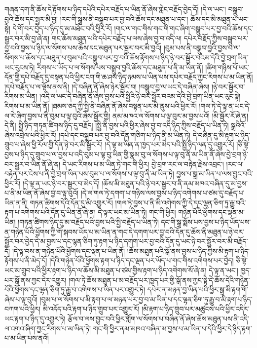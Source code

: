 གཞན་དག་ནི་ཆོས་དེ་རྟོགས་པ་ཉིད་དཔེའི་དཔེར་བརྗོད་པ་ཡིན་ནོ་ཞེས་གླེང་བརྗོད་བྱེད་དོ། །དེ་ལ་ཡང་། བསྒྲུབ་བྱའི་ཆོས་དང་སྦྱར་མི་བྱ། །རང་གི་སྒྲས་ནི་བསྒྲུབ་པར་བྱ་བའི་ཆོས་དང་མཐུན་པ་དང་། ཆོས་དང་མི་མཐུན་པ་ཡང་སྟེ། དེ་གོ་བར་བྱེད་པ་ཉིད་དུ་མ་མཐོང་བའི་ཕྱིར་རོ། །གང་ལ་གང་གིས་གང་གི་གང་ཞིག་བསྒྲུབ་པར་བྱ་བའི་ཆོས་དང་སྦྱར་བར་མི་བྱ་ཞེ་ན། གང་ཆོས་མཐུན་པའི་དཔེར་བརྗོད་པ་ལས་ཞེས་བྱ་བ་འདི་ལ། དཔེར་བརྗོད་ཀྱིས་བསྒྲུབ་པར་བྱ་བའི་བྱས་པ་ཉིད་ལ་སོགས་པས་ཆོས་དང་མཐུན་པར་སྦྱར་བར་མི་བྱའོ། །བུམ་པས་ནི་བསྒྲུབ་བྱའི་བྱས་པ་ལ་སོགས་པ་ཆོས་དང་མཐུན་པ་བུམ་པའི་བསྒྲུབ་པར་བྱ་བའི་ཆོས་རྟོགས་པ་ཉིད་ཉེ་བར་སྦྱོར་བའམ་དེའི་བྱེ་བྲག་ཡིན་ཡང་རུངས་ཏེ། རིགས་པ་ཡོད་པ་ལ་སོགས་པས་བསྒྲུབ་བྱའི་ཆོས་དང་མཐུན་པ་ནི་མ་ཡིན་ནོ། །ཚིག་གཉིས་པོ་ཡང་དོན་གྱི་དཔེ་བརྗོད་དུ་བསྟན་པའི་ཕྱིར་ངག་གི་ཆ་ཤས་ཉིད་ཉམས་པ་ཡིན་པས་དཔེར་བརྗོད་ཀྱང་རིགས་པ་མ་ཡིན་ནོ། །དཔེ་བརྗོད་པ་ལ་ལྟོས་ནས་ནི། །དེ་བཞིན་ནོ་ཞེས་ཉེར་སྦྱོར་བ། །བསྒྲུབ་བྱ་ལ་ཡང་དེ་བཞིན་ཞེས། །ཉེ་བར་སྦྱོར་བ་རིགས་མ་ཡིན། །འདི་ལ་ཡང་དེ་བཞིན་ནོ་ཞེས་བྱས་པའི་སྤྱིའི་ཉེ་བར་སྦྱོར་བའམ་དེའི་བྱེ་བྲག་ཡིན་ཡང་རུང་སྟེ། རིགས་པ་མ་ཡིན་ནོ། །ཐམས་ཅད་ཀྱི་སྤྱི་ནི་བཞིན་ནོ་ཞེས་བསྟན་པར་མི་ནུས་པའི་ཕྱིར་རོ། །གལ་ཏེ་དེ་ལྟ་ན་ཡང་དེ་ལ་རེ་ཞིག་བྱས་པ་ནི་བུམ་པ་ལྟ་བུའི་ཞེས་སྦྱོར་གྱི། ནམ་མཁའ་ལ་སོགས་པ་ལྟ་བུར་མ་བྱས་པའོ། །མི་སྦྱོར་རོ་ཞེ་ན། དེ་ནི། སྤྱི་ཉིད་གཏན་ཚིགས་ཉིད་དུ་བརྗོད། །སྤྱི་ནི་བྱས་པའི་ཕྱིར་ཞེས་བྱ་བ་འདི་ཉིད་ཀྱིས་བརྗོད་པ་ཡིན་ཏེ། སྒྲའིའོ་ཞེས་འབྲེལ་པའི་ཕྱིར་རོ། །དཔེ་དང་བསྒྲུབ་པར་བྱ་བའི་དོན་གཅིག་པ་ཉིད་ནི་མ་ཡིན་ཏེ། དེ་བཞིན་དུ་མི་རྟག་པ་ཉིད་གྲུབ་པ་ཞེས་ཕྱི་རོལ་གྱི་དོན་ཉེ་བར་མི་སྦྱོར་རོ། །དེ་ལྟ་མ་ཡིན་ན་ཁྱད་པར་མེད་པའི་སྤྱི་ཉིད་ལན་དུ་འགྱུར་རོ། །ཅི་སྟེ་བྱས་པ་ཉིད་དུ་གྲུབ་པ་ལ་བྱས་པ་འདི་བུམ་པ་ལྟ་བུ་ཡིན་གྱི་སྣམ་བུ་ལ་སོགས་པ་ལྟ་བུ་ནི་མ་ཡིན་ནོ་ཞེས་བྱེ་བྲག་ཉེ་བར་སྦྱར་བ་ཡིན་ནོ་ཞེ་ན། དེ་ཡང་རིགས་པ་མ་ཡིན་ཏེ་གང་གི་ཕྱིར། བྱེ་བྲག་རང་ལ་བརྟེན་རྗེས་འབྲང་། །རང་ལ་བརྟེན་པར་ངེས་པ་ནི་བྱེ་བྲག་ཡིན་པས་བུམ་པ་ལ་སོགས་པ་ལྟ་བུ་ནི་མ་ཡིན་ཏེ། བྱས་པ་སྒྲ་མ་ཡིན་པ་ལས་བྱུང་བའི་ཕྱིར་རོ། །དེ་ལྟ་ན་ཡང་ཉེ་བར་སྦྱར་བ་མེད་དོ། །ཆོས་མི་མཐུན་པའི་ཉེ་བར་སྦྱར་བ་ནི་ནམ་མཁའ་བཞིན་དུ་མ་བྱས་པ་ནི་མ་ཡིན་ནོ་ཞེས་བྱ་བ་ལྟ་བུའོ། །དེ་ལ་གལ་ཏེ་དགག་པ་གཉིས་ལས་བྱས་པ་ཉིད་འགེགས་པ་ཙམ་དུ་བརྗོད་པ་ཡིན་ན་ནི། གཏན་ཚིགས་དེའི་དོན་དུ་མི་འགྱུར་རོ། །གལ་ཏེ་བྱས་པ་ནི་མི་འགེགས་ཀྱི་དེ་དང་ལྷན་ཅིག་ཏུ་རྒྱུ་བའི་རྟག་པ་འགེགས་པའི་དོན་དུ་ཡིན་ནོ་ཞེ་ན། དེ་ལྟར་ཡང་མ་ཡིན་ཏེ། གང་གི་ཕྱིར། གཉེན་པོའི་ཕྱོགས་དང་ལྡན་མ་ཡིན། །གཏན་ཚིགས་ཉིད་དུ་མ་བརྗོད་པའི་བྱས་པའི་སྤྱི་བརྗོད་པ་ཡིན་ཏེ། དང་གི་སྒྲ་སྨོས་པས་བྱས་པ་ཉིད་ཡོད་པས་ན་གཉེན་པོའི་ཕྱོགས་ཀྱི་གོ་སྐབས་ཡོད་པ་མ་ཡིན་ན་གང་དེ་དགག་པར་བྱ་བའི་དོན་དུ་ཆོས་ནི་མཐུན་པ་ཉེ་བར་སྦྱོར་བར་བྱེད་དེ་མ་བྱས་པ་དང་ལྷན་ཅིག་ཏུ་རྟག་པ་ཉིད་དགག་པར་བྱ་བའི་དོན་དུ་ཡང་ཉེ་བར་སྦྱོར་བར་མི་བརྗོད་དོ། །དེ་ལྟ་བས་ན་གཉེན་པོའི་ཕྱོགས་དང་ལྡན་པ་ཡིན་ནོ། །ཆོས་མཐུན་པའི་སྒོ་ནས་བྱས་པ་ཉིད་ཀྱིས་མི་རྟག་པ་ཉིད་རྟོགས་པ་ནི་མེད་དོ། །དེའི་གཉེན་པོའི་ཕྱོགས་རྟག་པ་ཉིད་དང་ལྡན་པར་ཡོད་པ་གང་གིས་འགེགས་པར་བྱེད། ཅི་སྟེ་ཡང་མ་གྲུབ་པའི་ཕྱིར་རྟག་པ་ཉིད་ལ་ཆོས་མི་མཐུན་པ་ཙམ་གྱིས་རྟག་པ་ཉིད་འགེགས་སོ་ཞེ་ན། དེ་ལྟ་ན་ཡང་། ཁྱད་པར་སྒོ་ནས་ཀྱང་དེར་འགྱུར། །གལ་ཏེ་ཆོས་མཐུན་པ་མ་བརྗོད་པར་ཁྱད་པར་གྱི་སྒོ་ནས་ཀྱང་སྟེ་དེ་ཆོས་དེའི་གཉེན་པོའི་ཕྱོགས་དང་ལྷན་ཅིག་ཏུ་རྒྱུ་བ་འགེགས་པ་ཡིན་པར་འགྱུར་ཏེ། དཔེར་ན་མཉན་བྱ་ཡིན་པའི་ཕྱིར་སྒྲ་མི་རྟག་གོ་ཞེས་པ་ལྟ་བུའོ། །བུམ་པ་ལ་སོགས་པ་མི་རྟག་པ་ལ་མཉན་པར་བྱ་བ་མ་ཡིན་པ་དང་ལྷན་ཅིག་ཏུ་རྒྱུ་བ་མི་རྟག་པ་ཉིད་བཀག་པའི་ཕྱིར། མི་འདོད་པའི་རྟག་པ་ཉིད་གྲུབ་པར་འགྱུར་རོ། །མི་རྟག་པ་ཉིད་གྲུབ་པར་མཚུངས་པའི་ཕྱིར་འདིར་ཡང་རྟག་པ་ཉིད་དུ་འགྱུར་ཏེ། རྩོལ་བ་ལས་བྱུང་བའི་ཕྱིར་གློག་ལ་སོགས་པ་བཞིན་ནོ་ཞེས་ཆོས་མཐུན་པས་ནི་འདི་ལ་འགའ་ཞིག་ཀྱང་རིགས་པ་མ་ཡིན་ཏེ། གང་གི་ཕྱིར་ནམ་མཁའ་བཞིན་མ་བྱས་པ་མ་ཡིན་པ་དེའི་ཕྱིར་དེ་ཉིད་རྟག་པ་མ་ཡིན་པས་ནའོ། 